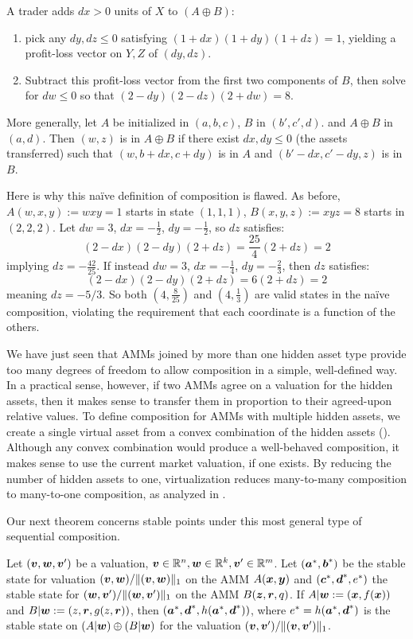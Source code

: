 A trader adds $dx > 0$ units of $X$ to $(A \oplus B)$:
\begin{enumerate}
\item pick any $dy,dz \leq 0$ satisfying $(1+dx)(1+dy)(1+dz) = 1$,
yielding a profit-loss vector on $Y,Z$ of $(dy,dz)$.
\item Subtract this profit-loss vector from the first two components of $B$,
then solve for $dw \leq 0$ so that $(2-dy) (2-dz) (2+dw) = 8$.
\end{enumerate}
More generally,
let $A$ be initialized in $(a,b,c)$, $B$ in $(b',c',d)$.
and $A \oplus B$ in $(a,d)$.
Then $(w,z)$ is in $A \oplus B$ if there exist $dx,dy \leq 0$
(the assets transferred)
such that $(w, b+dx, c+dy)$ is in $A$ and $(b'-dx, c'-dy, z)$ is in $B$.

Here is why this na\"ive definition of composition is flawed.
As before, $A(w,x,y) := wxy= 1$ starts in state $(1,1,1)$, 
$B(x,y,z) := xyz = 8$ starts in $(2,2,2)$.
Let $dw = 3$, $dx= -\frac{1}{2}$, $dy= - \frac{1}{2}$, so $dz$ satisfies:
\begin{equation*}
  (2-dx)(2-dy)(2+dz) = \frac{25}{4}(2+dz) = 2 
\end{equation*}
implying $dz = -\frac{42}{25}$.
If instead $dw = 3$, $dx= -\frac{1}{4}$, $dy= - \frac{2}{3}$, then $dz$ satisfies:
\begin{equation*}
  (2-dx)(2-dy)(2+dz) = 6(2+dz) = 2 
\end{equation*}
meaning $dz = -5/3$.
So both $(4,\frac{8}{25})$ and $(4,\frac{1}{3})$ are valid states in the na\"ive composition,
violating the requirement that each coordinate is a function of the others.

We have just seen that AMMs joined by more than one hidden asset type
provide too many degrees of freedom to allow composition in a simple, well-defined way.
In a practical sense, however,
if two AMMs agree on a valuation for the hidden assets,
then it makes sense to transfer them in proportion
to their agreed-upon relative values.
To define composition for AMMs with multiple hidden assets,
we create a single virtual asset from a convex combination of
the hidden assets ().
Although any convex combination would produce a well-behaved composition,
it makes sense to use the current market valuation,
if one exists.
By reducing the number of hidden assets to one,
virtualization reduces many-to-many composition to many-to-one composition, as analyzed in .

Our next theorem concerns stable points under this most general type of sequential composition.
\begin{theorem}
\sloppy
Let $({\boldsymbol v},{\boldsymbol w},{\boldsymbol v}')$ be a valuation, ${\boldsymbol v} \in \mathbb{R}^n,{\boldsymbol w} \in \mathbb{R}^k,{\boldsymbol v}' \in \mathbb{R}^m$.
Let $({\boldsymbol a}^{*},{\boldsymbol b}^{*})$ be the stable state for
valuation $({\boldsymbol v},{\boldsymbol w}) / \|({\boldsymbol v},{\boldsymbol w})\|_1$ on the AMM $A({\boldsymbol x},{\boldsymbol y})$
and $({\boldsymbol c}^{*},{\boldsymbol d}^{*},e^{*})$ the stable state for
$({\boldsymbol w},{\boldsymbol v}') / \|({\boldsymbol w},{\boldsymbol v}')\|_1$ on the AMM $B({\boldsymbol z},{\boldsymbol r},q)$.
If $A|{\boldsymbol w}:=({\boldsymbol x},f({\boldsymbol x}))$ and $B| {\boldsymbol w}:=(z,{\boldsymbol r},g(z,{\boldsymbol r}))$,
then $({\boldsymbol a}^{*},{\boldsymbol d}^{*},h({\boldsymbol a}^{*},{\boldsymbol d}^{*}))$,
where $e^{*} = h({\boldsymbol a}^{*},{\boldsymbol d}^{*})$ is the stable state on $(A | {\boldsymbol w}) \oplus (B | {\boldsymbol w})$
for the valuation $({\boldsymbol v},{\boldsymbol v}')  / \|({\boldsymbol v},{\boldsymbol v}')\|_1$.
\end{theorem}

